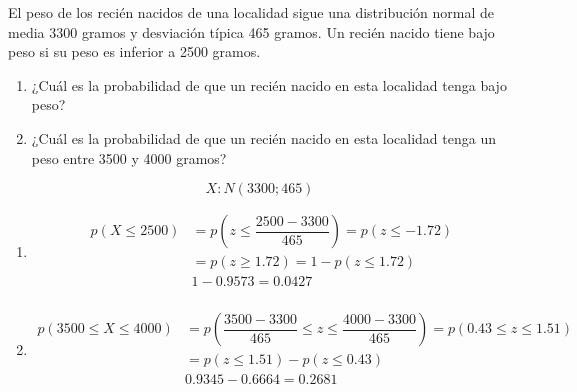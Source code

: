 \begin{exercise}
  El peso de los recién nacidos de una localidad sigue una distribución normal de media 3300 gramos y desviación típica 465 gramos. Un recién nacido tiene bajo peso si su peso es inferior a 2500 gramos.
  \begin{enumerate}[label=\alph* )]
  \item ¿Cuál es la probabilidad de que un recién nacido en esta localidad tenga bajo peso?
  \item ¿Cuál es la probabilidad de que un recién nacido en esta localidad tenga un peso entre 3500 y 4000 gramos?
  \end{enumerate}

  \tcblower

  \[ X:N(3300;465) \]
  \begin{enumerate}[label=\alph* )]
  \item
  \begin{align*}
  p(X \leq 2500) & = p \left(z \leq  \dfrac{2500-3300}{465} \right) = p (z \leq -1.72) \\
  & = p(z \geq 1.72)=1-p(z \leq 1.72) \\
  & 1-0.9573 = 0.0427 \\
  \end{align*}
  \item
  \begin{align*}
  p(3500 \leq X \leq 4000) & = p \left( \dfrac{3500-3300}{465} \leq z \leq \dfrac{4000-3300}{465} \right) = p (0.43 \leq z \leq 1.51) \\
  & = p(z \leq 1.51)-p(z \leq 0.43) \\
  & 0.9345-0.6664 = 0.2681 \\
  \end{align*}
  \end{enumerate}
\end{exercise}

